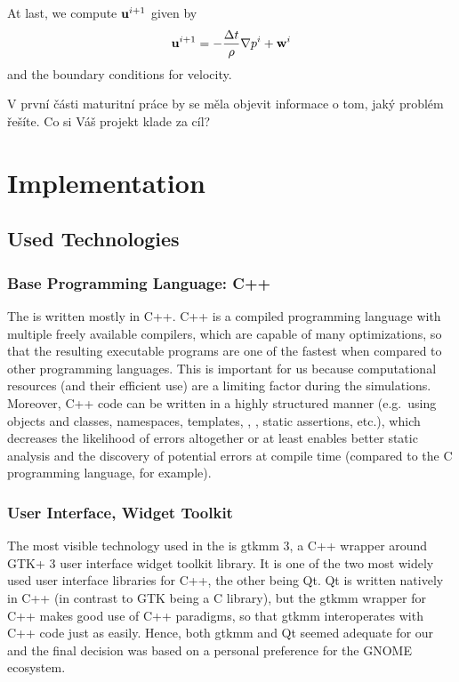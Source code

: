 \documentclass[11pt,a4paper,twoside,openright]{report}
\begin{document}
At last, we compute $\mathbf u^{i+1}$ given by
\begin{align*}
	\mathbf u^{i+1}=-\frac{\Delta t}\rho\nabla p^i+\mathbf w^i
\end{align*}
and the boundary conditions for velocity.

V první části maturitní práce by se měla objevit informace o tom, jaký problém řešíte. Co si Váš projekt klade za cíl?

\chapter{Implementation}

\section{Used Technologies}
\subsection{Base Programming Language: C++}
The \software{} is written mostly in C++. C++ is a compiled programming language with multiple freely available compilers, which are capable of many optimizations, so that the resulting executable programs are one of the fastest when compared to other programming languages. This is important for us because computational resources (and their efficient use) are a limiting factor during the simulations. Moreover, C++ code can be written in a highly structured manner (e.g.\ using objects and classes, namespaces, templates, , , static assertions, etc.), which decreases the likelihood of errors altogether or at least enables better static analysis and the discovery of potential errors at compile time (compared to the C programming language, for example). 

\subsection{User Interface, Widget Toolkit}
The most visible technology used in the \software{} is gtkmm 3, a C++ wrapper around GTK+ 3 user interface widget toolkit library. It is one of the two most widely used user interface libraries for C++, the other being Qt. Qt is written natively in C++ (in contrast to GTK being a C library), but the gtkmm wrapper for C++ makes good use of C++ paradigms, so that gtkmm interoperates with C++ code just as easily. Hence, both gtkmm and Qt seemed adequate for our \software{} and the final decision was based on a personal preference for the GNOME ecosystem.
\end{document}
